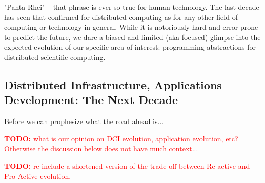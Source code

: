 \documentclass{article}
\newcommand{\I}[1]{\textit{#1}}
\newcommand{\B}[1]{\textbf{#1}}
\newcommand{\todo}[1]{{\textcolor{red}{\B{TODO:} #1 }}}
\newcommand{\jhanote}[1]{{\textcolor{red}{     \B{Shantenu:} #1 }}}
\newcommand{\jhanote}[1]{}
\begin{document}
 "Panta Rhei" -- that phrase is ever so true for human technology.
 The last decade has seen that confirmed for distributed computing as
 for any other field of computing or technology in general.  While it
 is notoriously hard and error prone to predict the future, we dare
 a biased and limited (aka focused) glimpse into the expected
 evolution of our specific area of interest: programming abstractions
 for distributed scientific computing. 

\subsection{Distributed Infrastructure, Applications Development: The Next Decade}
 Before we can prophesize what the road ahead is...

 \todo{what is our opinion on DCI evolution, application evolution,
   etc?  Otherwise the discussion below does not have much context...}



 \todo{re-include a shortened version of the trade-off between
 Re-active and Pro-Active evolution.}



\end{document}
